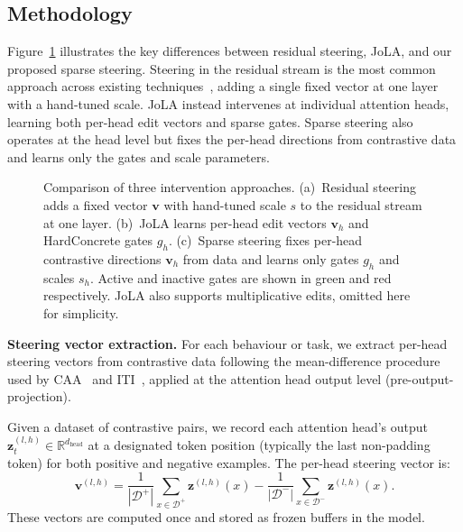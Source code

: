 \subsection{Methodology}\label{sec:methodology}

Figure~\ref{fig:method-comparison} illustrates the key differences between residual steering, JoLA, and our proposed sparse steering.
Steering in the residual stream is the most common approach across existing techniques~\cite{turner2025actadd,rimsky2024caa}, adding a single fixed vector at one layer with a hand-tuned scale.
JoLA instead intervenes at individual attention heads, learning both per-head edit vectors and sparse gates.
Sparse steering also operates at the head level but fixes the per-head directions from contrastive data and learns only the gates and scale parameters.

\begin{figure}[htbp]
\centering
\resizebox{\textwidth}{!}{%

}
\caption{Comparison of three intervention approaches. (a)~Residual steering adds a fixed vector $\mathbf{v}$ with hand-tuned scale $s$ to the residual stream at one layer. (b)~JoLA learns per-head edit vectors $\mathbf{v}_h$ and HardConcrete gates $g_h$. (c)~Sparse steering fixes per-head contrastive directions $\mathbf{v}_h$ from data and learns only gates $g_h$ and scales $s_h$. Active and inactive gates are shown in \textcolor{green!55!black}{green} and \textcolor{red!55!black}{red} respectively. JoLA also supports multiplicative edits, omitted here for simplicity.}
\label{fig:method-comparison}
\end{figure}

\textbf{Steering vector extraction.} For each behaviour or task, we extract per-head steering vectors from contrastive data following the mean-difference procedure used by CAA~\cite{rimsky2024caa} and ITI~\cite{li2024iti}, applied at the attention head output level (pre-output-projection).

Given a dataset of contrastive pairs, we record each attention head's output $\mathbf{z}_t^{(l,h)} \in \mathbb{R}^{d_\text{head}}$ at a designated token position (typically the last non-padding token) for both positive and negative examples.
The per-head steering vector is:
\begin{equation}
    \mathbf{v}^{(l,h)} = \frac{1}{|\mathcal{D}^+|}\sum_{x \in \mathcal{D}^+} \mathbf{z}^{(l,h)}(x) - \frac{1}{|\mathcal{D}^-|}\sum_{x \in \mathcal{D}^-} \mathbf{z}^{(l,h)}(x).
\end{equation}
These vectors are computed once and stored as frozen buffers in the model.

